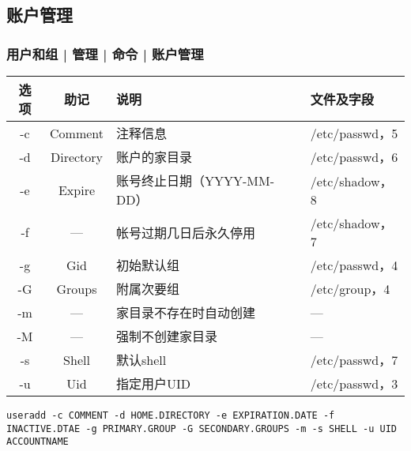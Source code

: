 \subsection{账户管理}
\begin{frame}[fragile]
  \frametitle{用户和组 | 管理 | 命令 | 账户管理}
  \begin{table}
    \centering
    \begin{tabular}{ccll}
      \hline
      \rowcolor{blue!50}\alert{选项} & 助记 & 说明 & 文件及字段\\
      \hline
      -c & Comment & 注释信息 & /etc/passwd，5\\
      -d & Directory & 账户的家目录 & /etc/passwd，6\\
      -e & Expire & 账号终止日期（YYYY-MM-DD） & /etc/shadow，8\\
      -f & --- & 帐号过期几日后永久停用 & /etc/shadow，7\\
      -g & Gid & 初始默认组 & /etc/passwd，4\\
      -G & Groups & 附属次要组 & /etc/group，4\\
      -m & --- & 家目录不存在时自动创建 & ---\\
      -M & --- & 强制不创建家目录 & ---\\
      -s & Shell & 默认shell & /etc/passwd，7\\
      -u & Uid & 指定用户UID & /etc/passwd，3\\
      \hline
    \end{tabular}
  \end{table}
  \pause
\begin{lstlisting}
useradd -c COMMENT -d HOME.DIRECTORY -e EXPIRATION.DATE -f INACTIVE.DTAE -g PRIMARY.GROUP -G SECONDARY.GROUPS -m -s SHELL -u UID ACCOUNTNAME
\end{lstlisting}
\end{frame}

